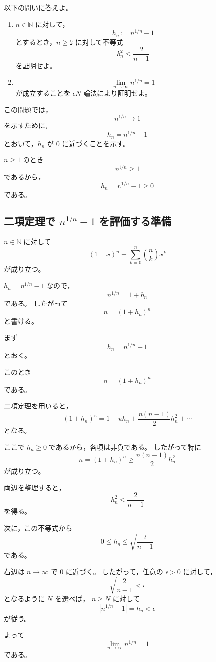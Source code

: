 \begin{exercise}
	以下の問いに答えよ。

	\begin{enumerate}
		\item $n\in\mathbb{N}$ に対して，
		\[
			h_n:=n^{1/n}-1
		\]
		とするとき，$n\geq 2$ に対して不等式
		\[
			h_n^2\leq \frac{2}{n-1}
		\]
		を証明せよ。

		\item
		\[
			\lim_{n\to\infty} n^{1/n}=1
		\]
		が成立することを $\epsilon N$ 論法により証明せよ。
	\end{enumerate}
\end{exercise}
\begin{background}
	この問題では，
	\[
		n^{1/n}\to 1
	\]
	を示すために，
	\[
		h_n=n^{1/n}-1
	\]
	とおいて，$h_n$ が $0$ に近づくことを示す。

	\begin{remark}
		$n\geq 1$ のとき
		\[
			n^{1/n}\geq 1
		\]
		であるから，
		\[
			h_n=n^{1/n}-1\geq 0
		\]
		である。
	\end{remark}

	\subsection{二項定理で $n^{1/n}-1$ を評価する準備}

	\begin{theorem}[二項定理]
		$n\in\mathbb{N}$ に対して
		\[
			(1+x)^n
			=
			\sum_{k=0}^{n}\binom{n}{k}x^k
		\]
		が成り立つ。
	\end{theorem}

	\begin{remark}
		$h_n=n^{1/n}-1$ なので，
		\[
			n^{1/n}=1+h_n
		\]
		である。
		したがって
		\[
			n=(1+h_n)^n
		\]
		と書ける。
	\end{remark}
\end{background}
\begin{strategy}
	まず
	\[
		h_n=n^{1/n}-1
	\]
	とおく。

	このとき
	\[
		n=(1+h_n)^n
	\]
	である。

	二項定理を用いると，
	\[
		(1+h_n)^n
		=
		1+nh_n+\frac{n(n-1)}{2}h_n^2+\cdots
	\]
	となる。

	ここで $h_n\geq 0$ であるから，各項は非負である。
	したがって特に
	\[
		n=(1+h_n)^n
		\geq
		\frac{n(n-1)}{2}h_n^2
	\]
	が成り立つ。

	両辺を整理すると，
	\[
		h_n^2\leq \frac{2}{n-1}
	\]
	を得る。

	次に，この不等式から
	\[
		0\leq h_n\leq \sqrt{\frac{2}{n-1}}
	\]
	である。

	右辺は $n\to\infty$ で $0$ に近づく。
	したがって，任意の $\epsilon>0$ に対して，
	\[
		\sqrt{\frac{2}{n-1}}<\epsilon
	\]
	となるように $N$ を選べば，
	$n\geq N$ に対して
	\[
		|n^{1/n}-1|=h_n<\epsilon
	\]
	が従う。

	よって
	\[
		\lim_{n\to\infty}n^{1/n}=1
	\]
	である。
\end{strategy}